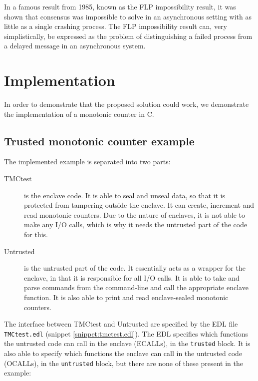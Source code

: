 \documentclass[12pt]{article}
\newcommand\cpp{C\nolinebreak[4]\hspace{-.05em}\raisebox{.4ex}{\relsize{-3}{\textbf{++}}}}
\begin{document}
		In a famous result from 1985, known as the FLP impossibility result\cite{flp}, it was shown that consensus was impossible to solve in an asynchronous setting with as little as a single crashing process. The FLP impossibility result can, very simplistically, be expressed as the problem of distinguishing a failed process from a delayed message in an asynchronous system.

	\section{Implementation}
	In order to demonstrate that the proposed solution could work, we demonstrate the implementation of a monotonic counter in \cpp.

	\subsection{Trusted monotonic counter example}
	The implemented example is separated into two parts:
	\begin{description}
		\item [TMCtest] is the enclave code. It is able to seal and unseal data, so that it is protected from tampering outside the enclave. It can create, increment and read monotonic counters. Due to the nature of enclaves, it is not able to make any I/O calls, which is why it needs the untrusted part of the code for this.
		\item [Untrusted] is the untrusted part of the code. It essentially acts as a wrapper for the enclave, in that it is responsible for all I/O calls. It is able to take and parse commands from the command-line and call the appropriate enclave function. It is also able to print and read enclave-sealed monotonic counters.  
	\end{description}
	The interface between TMCtest and Untrusted are specified by the EDL file \texttt{TMCtest.edl} (snippet \ref{snippet:tmctest.edl}). The EDL specifies which functions the untrusted code can call in the enclave (ECALLs), in the \texttt{trusted} block. 
	It is also able to specify which functions the enclave can call in the untrusted code (OCALLs), in the \texttt{untrusted} block, but there are none of these present in the example:
\end{document}
